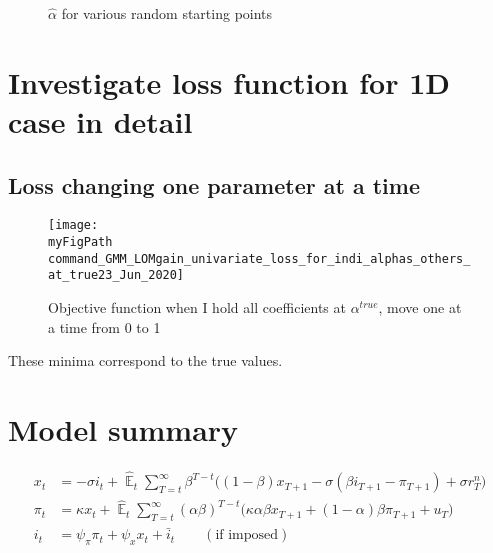 \documentclass[11pt]{article}
\def \myFigPath {../../figures/}
\renewcommand{\[}{\begin{equation}}
\renewcommand{\]}{\end{equation}}
\DeclareMathOperator{\E}{\mathbb{E}}
\def\myTinyFigScale{0.16}
\begin{document}
\begin{figure}[h!]
\hfill
{}
\hfill
{}
\caption{$\hat{\alpha}$ for various random starting points}
\end{figure}


\section{Investigate loss function for 1D case in detail}
\subsection{Loss changing one parameter at a time}
\begin{figure}[h!]
\texttt{[image: \\myFigPath command\_GMM\_LOMgain\_univariate\_loss\_for\_indi\_alphas\_others\_at\_true23\_Jun\_2020]}
\caption{Objective function when I hold all coefficients at $\alpha^{true}$, move one at a time from 0 to 1}
\end{figure}

These minima correspond to the true values. 

    \clearpage
\appendix
\section{Model summary}

\vspace{-0.5cm}

\begin{align}
x_t &=  -\sigma i_t +\hat{\E}_t \sum_{T=t}^{\infty} \beta^{T-t }\big( (1-\beta)x_{T+1} - \sigma(\beta i_{T+1} - \pi_{T+1}) +\sigma r_T^n \big)  \label{A1}  \\
\pi_t &= \kappa x_t +\hat{\E}_t \sum_{T=t}^{\infty} (\alpha\beta)^{T-t }\big( \kappa \alpha \beta x_{T+1} + (1-\alpha)\beta \pi_{T+1} + u_T\big) \label{A2}  \\
i_t &= \psi_{\pi}\pi_t + \psi_{x} x_t  + \bar{i}_t \label{TR} \quad \quad (\text{if imposed})
\end{align}
\end{document}
